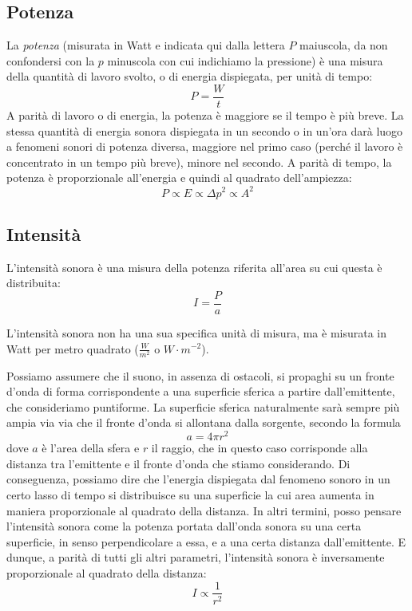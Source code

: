 \subsection{Potenza}

La \emph{potenza} (misurata in Watt e indicata qui dalla lettera $P$ maiuscola, da non confondersi con la $p$ minuscola con cui indichiamo la pressione) è una misura della quantità di lavoro svolto, o di energia dispiegata, per unità di tempo: 
\begin{equation}
P = \frac{W}{t}
\end{equation}
A parità di lavoro o di energia, la potenza è maggiore se il tempo è più breve. La stessa quantità di energia sonora dispiegata in un secondo o in un'ora darà luogo a fenomeni sonori di potenza diversa, maggiore nel primo caso (perché il lavoro è concentrato in un tempo più breve), minore nel secondo. A parità di tempo, la potenza è proporzionale all'energia e quindi al quadrato dell'ampiezza:
\begin{equation}
P \propto E \propto \Delta p^2 \propto A^2
\end{equation}



\subsection{Intensità}

L'intensità sonora è una misura della potenza riferita all'area su cui questa è distribuita:
\begin{equation}
I = \frac{P}{a}
\end{equation}

L'intensità sonora non ha una sua specifica unità di misura, ma è misurata in Watt per metro quadrato ($\frac{W}{m^2}$ o $W \cdot m^{-2}$).

Possiamo assumere che il suono, in assenza di ostacoli, si propaghi su un fronte d'onda di forma corrispondente a una superficie sferica a partire dall'emittente, che consideriamo puntiforme. La superficie sferica naturalmente sarà sempre più ampia via via che il fronte d'onda si allontana dalla sorgente, secondo la formula
\begin{equation}
a = 4 \pi r^2
\end{equation}
dove $a$ è l'area della sfera e $r$ il raggio, che in questo caso corrisponde alla distanza tra l'emittente e il fronte d'onda che stiamo considerando. Di conseguenza, possiamo dire che l'energia dispiegata dal fenomeno sonoro in un certo lasso di tempo si distribuisce su una superficie la cui area aumenta in maniera proporzionale al quadrato della distanza. In altri termini, posso pensare l'intensità sonora come la potenza portata dall'onda sonora su una certa superficie, in senso perpendicolare a essa, e a una certa distanza dall'emittente. E dunque, a parità di tutti gli altri parametri, l'intensità sonora è inversamente proporzionale al quadrato della distanza:
\begin{equation}
I \propto \frac{1}{r^2}
\end{equation}

